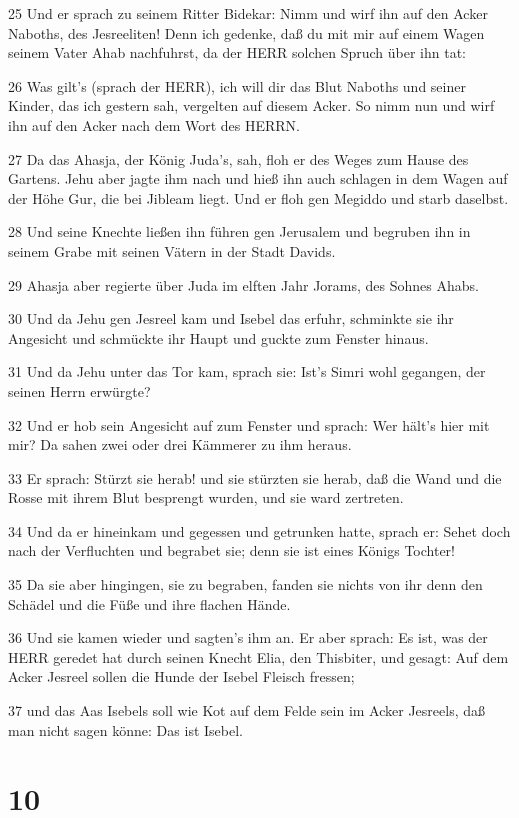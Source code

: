 \par 25 Und er sprach zu seinem Ritter Bidekar: Nimm und wirf ihn auf den Acker Naboths, des Jesreeliten! Denn ich gedenke, daß du mit mir auf einem Wagen seinem Vater Ahab nachfuhrst, da der HERR solchen Spruch über ihn tat:
\par 26 Was gilt's (sprach der HERR), ich will dir das Blut Naboths und seiner Kinder, das ich gestern sah, vergelten auf diesem Acker. So nimm nun und wirf ihn auf den Acker nach dem Wort des HERRN.
\par 27 Da das Ahasja, der König Juda's, sah, floh er des Weges zum Hause des Gartens. Jehu aber jagte ihm nach und hieß ihn auch schlagen in dem Wagen auf der Höhe Gur, die bei Jibleam liegt. Und er floh gen Megiddo und starb daselbst.
\par 28 Und seine Knechte ließen ihn führen gen Jerusalem und begruben ihn in seinem Grabe mit seinen Vätern in der Stadt Davids.
\par 29 Ahasja aber regierte über Juda im elften Jahr Jorams, des Sohnes Ahabs.
\par 30 Und da Jehu gen Jesreel kam und Isebel das erfuhr, schminkte sie ihr Angesicht und schmückte ihr Haupt und guckte zum Fenster hinaus.
\par 31 Und da Jehu unter das Tor kam, sprach sie: Ist's Simri wohl gegangen, der seinen Herrn erwürgte?
\par 32 Und er hob sein Angesicht auf zum Fenster und sprach: Wer hält's hier mit mir? Da sahen zwei oder drei Kämmerer zu ihm heraus.
\par 33 Er sprach: Stürzt sie herab! und sie stürzten sie herab, daß die Wand und die Rosse mit ihrem Blut besprengt wurden, und sie ward zertreten.
\par 34 Und da er hineinkam und gegessen und getrunken hatte, sprach er: Sehet doch nach der Verfluchten und begrabet sie; denn sie ist eines Königs Tochter!
\par 35 Da sie aber hingingen, sie zu begraben, fanden sie nichts von ihr denn den Schädel und die Füße und ihre flachen Hände.
\par 36 Und sie kamen wieder und sagten's ihm an. Er aber sprach: Es ist, was der HERR geredet hat durch seinen Knecht Elia, den Thisbiter, und gesagt: Auf dem Acker Jesreel sollen die Hunde der Isebel Fleisch fressen;
\par 37 und das Aas Isebels soll wie Kot auf dem Felde sein im Acker Jesreels, daß man nicht sagen könne: Das ist Isebel.

\chapter{10}

